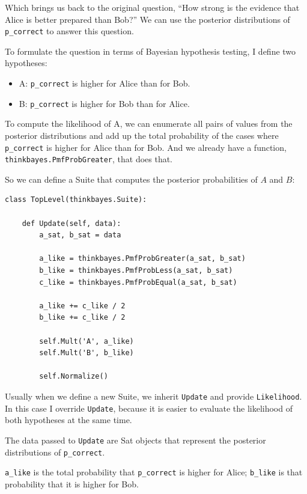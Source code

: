 \documentclass[12pt]{book}
\begin{document}
Which brings us back to the original question, ``How strong is the
evidence that Alice is better prepared than Bob?''  We can use the
posterior distributions of \verb"p_correct" to answer this question.

To formulate the question in terms of Bayesian hypothesis testing,
I define two hypotheses:

\begin{itemize}

\item A: \verb"p_correct" is higher for Alice than for Bob.

\item B: \verb"p_correct" is higher for Bob than for Alice.

\end{itemize}

To compute the likelihood of A, we can enumerate all pairs of values
from the posterior distributions and add up the total probability of
the cases where \verb"p_correct" is higher for Alice than for Bob.
And we already have a function, \verb"thinkbayes.PmfProbGreater",
that does that.

So we can define a Suite that computes the posterior probabilities
of $A$ and $B$:

\begin{verbatim}
class TopLevel(thinkbayes.Suite):

    def Update(self, data):
        a_sat, b_sat = data

        a_like = thinkbayes.PmfProbGreater(a_sat, b_sat)
        b_like = thinkbayes.PmfProbLess(a_sat, b_sat)
        c_like = thinkbayes.PmfProbEqual(a_sat, b_sat)

        a_like += c_like / 2
        b_like += c_like / 2

        self.Mult('A', a_like)
        self.Mult('B', b_like)

        self.Normalize()
\end{verbatim}

Usually when we define a new Suite, we inherit {\tt Update}
and provide {\tt Likelihood}.  In this case I override {\tt Update},
because it is easier to evaluate the likelihood of both
hypotheses at the same time.

The data passed to {\tt Update} are Sat objects that represent
the posterior distributions of \verb"p_correct".

\verb"a_like" is the total probability that
\verb"p_correct" is higher for Alice; \verb"b_like" is that
probability that it is higher for Bob.
\end{document}
